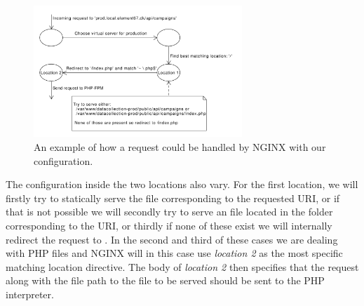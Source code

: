 \\
\begin{figure}[!htbp]
    \centering
    \includegraphics[width=0.7\textwidth]{graphic/architecture/NGINX_workflow.pdf}
    \caption{An example of how a request could be handled by NGINX with our configuration.}
    \label{fig:NGINX_workflow}
\end{figure}
\FloatBarrier

The configuration inside the two locations also vary. For the first location, we will firstly try to statically serve the file corresponding to the requested URI, or if that is not possible we will secondly try to serve an  file located in the folder corresponding to the URI, or thirdly if none of these exist we will internally redirect the request to . In the second and third of these cases we are dealing with PHP files and NGINX will in this case use \emph{location 2} as the most specific matching location directive. The body of \emph{location 2} then specifies that the request along with the file path to the file to be served should be sent to the PHP interpreter. 

